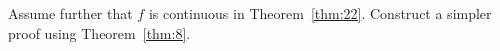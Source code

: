 \documentclass[thmcnt=section, color=blue, 12pt]{my-elegantbook}
\begin{document}
\begin{exercise}
	Assume further that $f$ is continuous in Theorem~\ref{thm:22}.
	Construct a simpler proof using Theorem~\ref{thm:8}.
\end{exercise}



\printbibliography[heading=bibintoc, title=References]


\printindex
\end{document}
